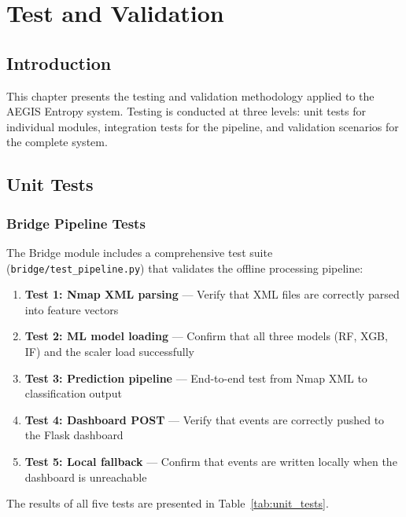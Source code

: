 
\chapter{Test and Validation}\label{ch:test_validation}

\section{Introduction}

This chapter presents the testing and validation methodology applied to the AEGIS Entropy system. Testing is conducted at three levels: unit tests for individual modules, integration tests for the pipeline, and validation scenarios for the complete system.

\section{Unit Tests}

\subsection{Bridge Pipeline Tests}

The Bridge module includes a comprehensive test suite (\texttt{bridge/test\_pipeline.py}) that validates the offline processing pipeline:

\begin{enumerate}
    \item \textbf{Test 1: Nmap XML parsing} --- Verify that XML files are correctly parsed into feature vectors
    \item \textbf{Test 2: ML model loading} --- Confirm that all three models (RF, XGB, IF) and the scaler load successfully
    \item \textbf{Test 3: Prediction pipeline} --- End-to-end test from Nmap XML to classification output
    \item \textbf{Test 4: Dashboard POST} --- Verify that events are correctly pushed to the Flask dashboard
    \item \textbf{Test 5: Local fallback} --- Confirm that events are written locally when the dashboard is unreachable
\end{enumerate}

The results of all five tests are presented in Table~\ref{tab:unit_tests}.

